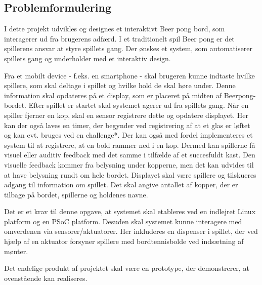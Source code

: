 \documentclass[a4paper,12pt,fleqn,oneside]{article}
\begin{document}
\subsection{Problemformulering}
I dette projekt udvikles og designes et interaktivt Beer pong bord, som interagerer ud fra brugerens adfærd. I et traditionelt spil Beer pong er det spillerens ansvar at styre spillets gang. Der ønskes et system, som automatiserer spillets gang og underholder med et interaktiv design. 

Fra et mobilt device - f.eks. en smartphone - skal brugeren kunne indtaste hvilke spillere, som skal deltage i spillet og hvilke hold de skal høre under. Denne information skal opdateres på et display, som er placeret på midten af Beerpong-bordet. Efter spillet er startet skal systemet agerer ud fra spillets gang. Når en spiller fjerner en kop, skal en sensor registrere dette og opdatere displayet. Her kan der også laves en timer, der begynder ved registrering af at et glas er løftet og kan evt. bruges ved en challenge*. Der kan også med fordel implementeres et system til at registrere, at en bold rammer ned i en kop. Dermed kan spillerne få visuel eller auditiv feedback med det samme i tilfælde af et succesfuldt kast. 
Den visuelle feedback kommer fra belysning under kopperne, men det kan udvides til at have belysning rundt om hele bordet. Displayet skal være spillere og tilskueres adgang til information om spillet. Det skal angive antallet af kopper, der er tilbage på bordet, spillerne og holdenes navne.  

Det er et krav til denne opgave, at systemet skal etableres ved en indlejret Linux platform og en PSoC platform. Desuden skal systemet kunne interagere med omverdenen via sensorer/aktuatorer. Her inkluderes en dispenser i spillet, der ved hjælp af en aktuator forsyner spillere med bordtennisbolde ved indsætning af mønter.

Det endelige produkt af projektet skal være en prototype, der demonstrerer, at ovenstående kan realiseres. 
\end{document}
